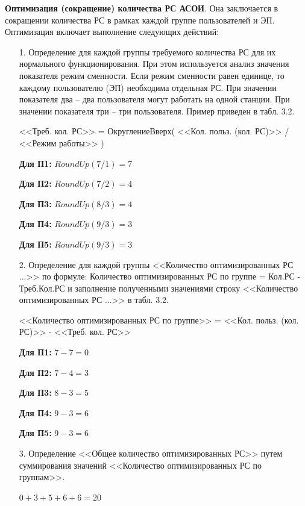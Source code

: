 \documentclass[12pt, a4paper, simple]{eskdtext}
\begin{document}
    \newpage
    \textbf{Оптимизация (сокращение) количества РС АСОИ}.
    Она заключается в сокращении количества РС в рамках каждой группе пользователей и ЭП.
    Оптимизация включает выполнение следующих дей­ствий:
    \begin{enumerate}
        \item[1.] Определение для каждой группы требуемого количества РС для их нормального функционирова­ния.
        При этом используется анализ значения показателя режим сменности.
        Если режим сменности равен единице, то каждому пользователю (ЭП) необходима отдельная РС.
        При значении показателя два – два пользователя могут работать на одной станции.
        При значении показателя три – три пользователя. Пример приведен в табл. 3.2. 

        <<Треб. кол. РС>> = ОкруглениеВверх( <<Кол. польз. (кол. РС)>> / <<Режим работы>> )

        \textbf{Для П1:} $RoundUp(7 / 1) = 7$ 

        \textbf{Для П2:} $RoundUp(7 / 2) = 4$

        \textbf{Для П3:} $RoundUp(8 / 3) = 4$

        \textbf{Для П4:} $RoundUp(9 / 3) = 3$

        \textbf{Для П5:} $RoundUp(9 / 3) = 3$

        \item[2.] Определение для каждой группы <<Количество оптимизированных РС ...>> по формуле:   
        Количество оптимизированных РС по группе = Кол.РС - Треб.Кол.РС
        и заполнение полученными значениями строку <<Количество оптимизированных РС ...>> в табл. 3.2.

        <<Количество оптимизированных РС по группе>> = <<Кол. польз. (кол. РС)>> - <<Треб. кол. РС>>

        \textbf{Для П1:} $7 - 7 = 0$ 

        \textbf{Для П2:} $7 - 4 = 3$

        \textbf{Для П3:} $8 - 3 = 5$

        \textbf{Для П4:} $9 - 3 = 6$

        \textbf{Для П5:} $9 - 3 = 6$

        \item[3.] Определение <<Общее количество оптимизированных РС>> путем суммирования значений
        <<Коли­чество оптимизированных РС по группам>>. 

        $0 + 3 + 5 + 6 + 6 = 20$
    \end{enumerate}
\end{document}
